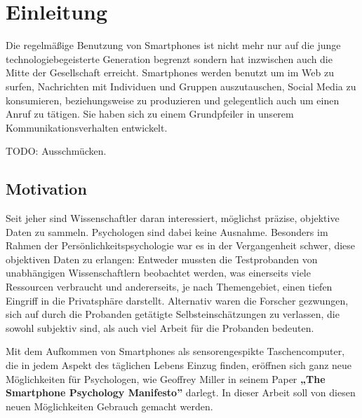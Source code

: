 
\chapter{Einleitung}
\label{ch:Einleitung}

Die regelmäßige Benutzung von Smartphones ist nicht mehr nur auf die junge technologiebegeisterte Generation begrenzt
sondern hat inzwischen auch die Mitte der Gesellschaft erreicht\cite{smartphonealter}.
Smartphones werden benutzt um im Web zu surfen, Nachrichten mit Individuen und Gruppen auszutauschen, Social Media zu konsumieren, beziehungsweise zu produzieren und gelegentlich auch um einen Anruf zu tätigen.
Sie haben sich zu einem Grundpfeiler in unserem Kommunikationsverhalten entwickelt.

\par

TODO: Ausschmücken.


\section{Motivation}

Seit jeher sind Wissenschaftler daran interessiert, möglichst präzise, objektive Daten zu sammeln.
Psychologen sind dabei keine Ausnahme.
Besonders im Rahmen der Persönlichkeitspsychologie war es in der Vergangenheit schwer, diese objektiven Daten zu erlangen:
Entweder mussten die Testprobanden von unabhängigen Wissenschaftlern beobachtet werden,
was einerseits viele Ressourcen verbraucht und andererseits, je nach Themengebiet,
einen tiefen Eingriff in die Privatsphäre darstellt. Alternativ waren die Forscher gezwungen,
sich auf durch die Probanden getätigte Selbsteinschätzungen zu verlassen,
die sowohl subjektiv sind, als auch viel Arbeit für die Probanden bedeuten. %
\par
Mit dem Aufkommen von Smartphones als sensorengespikte Taschencomputer, die in jedem Aspekt des täglichen Lebens Einzug finden,
eröffnen sich ganz neue Möglichkeiten für Psychologen, wie Geoffrey Miller in seinem Paper \textbf{„The Smartphone Psychology Manifesto”} \cite{miller2012smartphone}
darlegt. In dieser Arbeit soll von diesen neuen Möglichkeiten Gebrauch gemacht werden.\par





